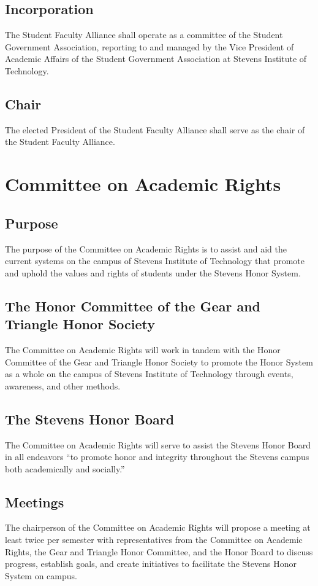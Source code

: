 \documentclass[12pt]{scrreprt}
\begin{document}
\subsection{Incorporation}
The Student Faculty Alliance shall operate as a committee of the Student Government
Association, reporting to and managed by the Vice President of Academic Affairs of the
Student Government Association at Stevens Institute of Technology.

\subsection{Chair}
The elected President of the Student Faculty Alliance shall serve as the chair of the Student Faculty Alliance.

\section{Committee on Academic Rights}

\subsection{Purpose}
The purpose of the Committee on Academic Rights is to assist and aid the current
systems on the campus of Stevens Institute of Technology that promote and uphold the
values and rights of students under the Stevens Honor System.

\subsection{The Honor Committee of the Gear and Triangle Honor Society}
The Committee on Academic Rights will work in tandem with the Honor Committee of
the Gear and Triangle Honor Society to promote the Honor System as a whole on the
campus of Stevens Institute of Technology through events, awareness, and other
methods. 

\subsection{The Stevens Honor Board}
The Committee on Academic Rights will serve to assist the Stevens Honor Board in all
endeavors “to promote honor and integrity throughout the Stevens campus both
academically and socially.”

\subsection{Meetings}
The chairperson of the Committee on Academic Rights will propose a meeting at least
twice per semester with representatives from the Committee on Academic Rights, the
Gear and Triangle Honor Committee, and the Honor Board to discuss progress, establish
goals, and create initiatives to facilitate the Stevens Honor System on campus. 
\end{document}
